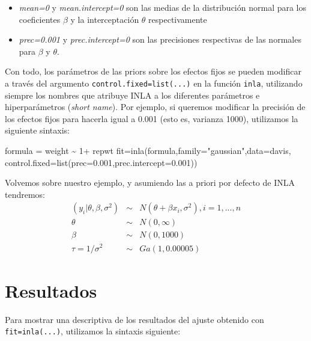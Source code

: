 \documentclass[
]{book}
\newenvironment{Shaded}{\begin{snugshade}}{\end{snugshade}}
\newcommand{\AttributeTok}[1]{\textcolor[rgb]{0.77,0.63,0.00}{#1}}
\newcommand{\DecValTok}[1]{\textcolor[rgb]{0.00,0.00,0.81}{#1}}
\newcommand{\FloatTok}[1]{\textcolor[rgb]{0.00,0.00,0.81}{#1}}
\newcommand{\FunctionTok}[1]{\textcolor[rgb]{0.00,0.00,0.00}{#1}}
\newcommand{\NormalTok}[1]{#1}
\newcommand{\OtherTok}[1]{\textcolor[rgb]{0.56,0.35,0.01}{#1}}
\newcommand{\SpecialCharTok}[1]{\textcolor[rgb]{0.00,0.00,0.00}{#1}}
\newcommand{\StringTok}[1]{\textcolor[rgb]{0.31,0.60,0.02}{#1}}
\providecommand{\tightlist}{%
  \setlength{\itemsep}{0pt}\setlength{\parskip}{0pt}}
\begin{document}
\begin{itemize}
\tightlist
\item
  \emph{mean=0} y \emph{mean.intercept=0} son las medias de la distribución normal para los coeficientes \(\beta\) y la interceptación \(\theta\) respectivamente
\item
  \emph{prec=0.001} y \emph{prec.intercept=0} son las precisiones respectivas de las normales para \(\beta\) y \(\theta\).
\end{itemize}

Con todo, los parámetros de las priors sobre los efectos fijos se pueden modificar a través del argumento \texttt{control.fixed=list(...)} en la función \texttt{inla}, utilizando siempre los nombres que atribuye INLA a los diferentes parámetros e hiperparámetros (\emph{short name}). Por ejemplo, si queremos modificar la precisión de los efectos fijos para hacerla igual a 0.001 (esto es, varianza 1000), utilizamos la siguiente sintaxis:

\begin{Shaded}
\begin{Highlighting}[]
\NormalTok{formula }\OtherTok{=}\NormalTok{ weight }\SpecialCharTok{\textasciitilde{}} \DecValTok{1}\SpecialCharTok{+}\NormalTok{ repwt}
\NormalTok{fit}\OtherTok{=}\FunctionTok{inla}\NormalTok{(formula,}\AttributeTok{family=}\StringTok{"gaussian"}\NormalTok{,}\AttributeTok{data=}\NormalTok{davis,}
         \AttributeTok{control.fixed=}\FunctionTok{list}\NormalTok{(}\AttributeTok{prec=}\FloatTok{0.001}\NormalTok{,}\AttributeTok{prec.intercept=}\FloatTok{0.001}\NormalTok{))}
\end{Highlighting}
\end{Shaded}

Volvemos sobre nuestro ejemplo, y asumiendo las a priori por defecto de INLA tendremos:
\begin{eqnarray*}
(y_i|\theta,\beta,\sigma^2) & \sim & N(\theta+\beta x_i,\sigma^2), i=1,...,n \\
\theta & \sim & N(0,\infty) \\
\beta & \sim & N(0,1000) \\
\tau=1/\sigma^2 & \sim & Ga(1,0.00005)
\end{eqnarray*}

\hypertarget{resultados}{%
\section{Resultados}\label{resultados}}

Para mostrar una descriptiva de los resultados del ajuste obtenido con \texttt{fit=inla(...)},
utilizamos la sintaxis siguiente:
\end{document}
